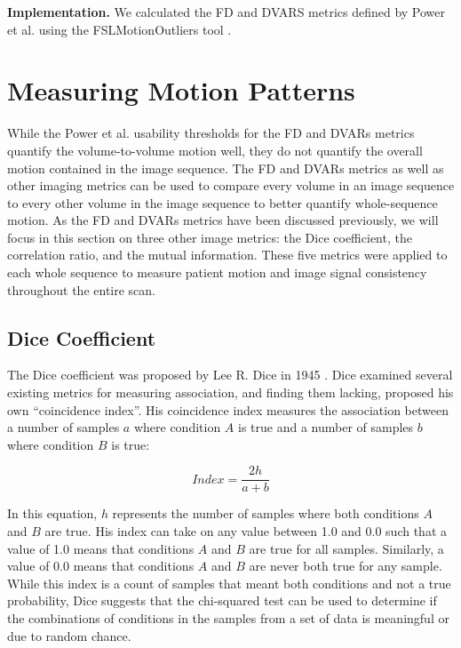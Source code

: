 \textbf{Implementation.} We calculated the FD and DVARS metrics defined by Power et al. using the FSLMotionOutliers tool \cite{Power2012}. 

\section{Measuring Motion Patterns}

While the Power et al. usability thresholds for the FD and DVARs metrics quantify the volume-to-volume motion well, they do not quantify the overall motion contained in the image sequence. The FD and DVARs metrics as well as other imaging metrics can be used to compare every volume in an image sequence to every other volume in the image sequence to better quantify whole-sequence motion. As the FD and DVARs metrics have been discussed previously, we will focus in this section on three other image metrics: the Dice coefficient, the correlation ratio, and the mutual information. These five metrics were applied to each whole sequence to measure patient motion and image signal consistency throughout the entire scan.

\subsection{Dice Coefficient}

The Dice coefficient was proposed by Lee R. Dice in 1945 \cite{Dice1945}. Dice examined several existing metrics for measuring association, and finding them lacking, proposed his own ``coincidence index''. His coincidence index measures the association between a number of samples $a$ where condition $A$ is true and a number of samples $b$ where condition $B$ is true:

\begin{equation}
Index = \frac{2h}{a+b}
\end{equation}

In this equation, $h$ represents the number of samples where both conditions $A$ and $B$ are true. His index can take on any value between 1.0 and 0.0 such that a value of 1.0 means that conditions $A$ and $B$ are true for all samples. Similarly, a value of 0.0 means that conditions $A$ and $B$ are never both true for any sample. While this index is a count of samples that meant both conditions and not a true probability, Dice suggests that the chi-squared test can be used to determine if the combinations of conditions in the samples from a set of data is meaningful or due to random chance. 

